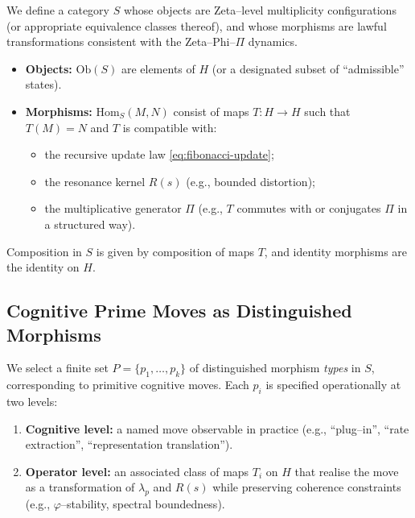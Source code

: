 \documentclass[11pt]{article}
\begin{document}
We define a category $S$ whose objects are Zeta--level multiplicity configurations (or appropriate equivalence classes thereof), and whose morphisms are lawful transformations consistent with the Zeta--Phi--$\Pi$ dynamics.

\begin{itemize}[nosep]
  \item \textbf{Objects:} $\mathrm{Ob}(S)$ are elements of $H$ (or a designated subset of ``admissible'' states).
  \item \textbf{Morphisms:} $\mathrm{Hom}_S(M,N)$ consist of maps $T:H\to H$ such that $T(M)=N$ and $T$ is compatible with: 
  \begin{itemize}[nosep]
    \item the recursive update law \eqref{eq:fibonacci-update};
    \item the resonance kernel $R(s)$ (e.g., bounded distortion);
    \item the multiplicative generator $\Pi$ (e.g., $T$ commutes with or conjugates $\Pi$ in a structured way).
  \end{itemize}
\end{itemize}

Composition in $S$ is given by composition of maps $T$, and identity morphisms are the identity on $H$.

\subsection{Cognitive Prime Moves as Distinguished Morphisms}

We select a finite set $P=\{p_1,\dots,p_k\}$ of distinguished morphism \emph{types} in $S$, corresponding to primitive cognitive moves.
Each $p_i$ is specified operationally at two levels:

\begin{enumerate}[nosep]
  \item \textbf{Cognitive level:} a named move observable in practice (e.g., ``plug--in'', ``rate extraction'', ``representation translation'').
  \item \textbf{Operator level:} an associated class of maps $T_i$ on $H$ that realise the move as a transformation of $\lambda_p$ and $R(s)$ while preserving coherence constraints (e.g., $\varphi$--stability, spectral boundedness).
\end{enumerate}
\end{document}
